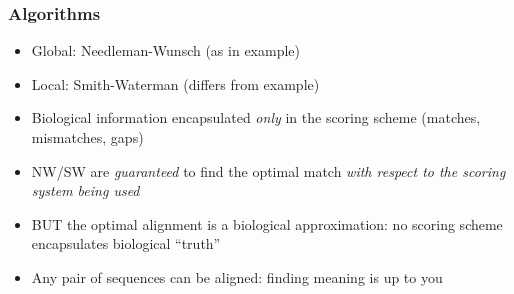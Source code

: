 \begin{frame}
  \frametitle{Algorithms}
  \begin{itemize}
    \item<1-> Global: Needleman-Wunsch (as in example)
    \item<1-> Local: Smith-Waterman (differs from example)
    \item<2-> Biological information encapsulated \emph{only} in the scoring scheme (matches, mismatches, gaps)
    \item<3-> NW/SW are \emph{guaranteed} to find the optimal match \emph{with respect to the scoring system being used}
    \item<3-> BUT the optimal alignment is a biological approximation: no scoring scheme encapsulates biological ``truth''
    \item<3-> Any pair of sequences can be aligned: finding meaning is up to you
  \end{itemize}
\end{frame}   